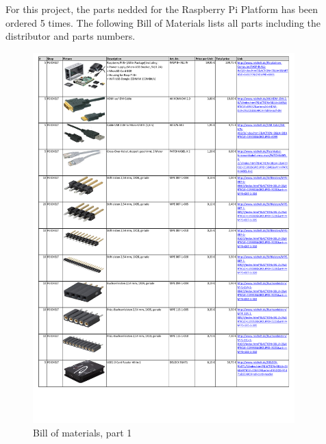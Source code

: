 For this project, the parts nedded for the Raspberry Pi Platform has been ordered 5 times. The following Bill of Materials lists all parts including the distributor and parts numbers.

\begin{figure}[H]
    \centering
    \includegraphics[width=0.90\textwidth,trim=0 80 0 8,clip=true]{fig/ch-rpi-hardware/1_Masterquad2015_BoM}
    \caption{Bill of materials, part 1}
    \label{fig:hardware:BillOfMat:1}
\end{figure}

